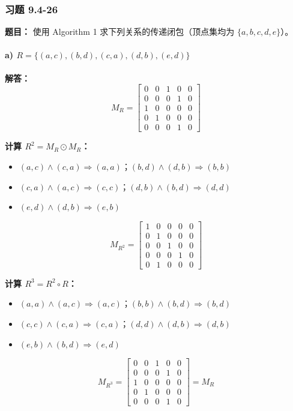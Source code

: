 \documentclass[11pt,UTF8]{article}
\begin{document}
\subsubsection*{习题 9.4-26}
\textbf{题目：} 使用 Algorithm 1 求下列关系的传递闭包（顶点集均为 $\{a,b,c,d,e\}$）。

\paragraph{a) $R = \{(a,c),(b,d),(c,a),(d,b),(e,d)\}$}

\textbf{解答：}
\[
M_R = \begin{bmatrix}
0 & 0 & 1 & 0 & 0 \\
0 & 0 & 0 & 1 & 0 \\
1 & 0 & 0 & 0 & 0 \\
0 & 1 & 0 & 0 & 0 \\
0 & 0 & 0 & 1 & 0
\end{bmatrix}
\]

\textbf{计算 $R^2 = M_R \odot M_R$：}
\begin{itemize}
    \item $(a,c)\land(c,a) \Rightarrow (a,a)$；$(b,d)\land(d,b) \Rightarrow (b,b)$
    \item $(c,a)\land(a,c) \Rightarrow (c,c)$；$(d,b)\land(b,d) \Rightarrow (d,d)$
    \item $(e,d)\land(d,b) \Rightarrow (e,b)$
\end{itemize}
\[
M_{R^2} = \begin{bmatrix}
1 & 0 & 0 & 0 & 0 \\
0 & 1 & 0 & 0 & 0 \\
0 & 0 & 1 & 0 & 0 \\
0 & 0 & 0 & 1 & 0 \\
0 & 1 & 0 & 0 & 0
\end{bmatrix}
\]

\textbf{计算 $R^3 = R^2 \circ R$：}
\begin{itemize}
    \item $(a,a)\land(a,c) \Rightarrow (a,c)$；$(b,b)\land(b,d) \Rightarrow (b,d)$
    \item $(c,c)\land(c,a) \Rightarrow (c,a)$；$(d,d)\land(d,b) \Rightarrow (d,b)$
    \item $(e,b)\land(b,d) \Rightarrow (e,d)$
\end{itemize}
\[
M_{R^3} = \begin{bmatrix}
0 & 0 & 1 & 0 & 0 \\
0 & 0 & 0 & 1 & 0 \\
1 & 0 & 0 & 0 & 0 \\
0 & 1 & 0 & 0 & 0 \\
0 & 0 & 0 & 1 & 0
\end{bmatrix} = M_R
\]
\end{document}
